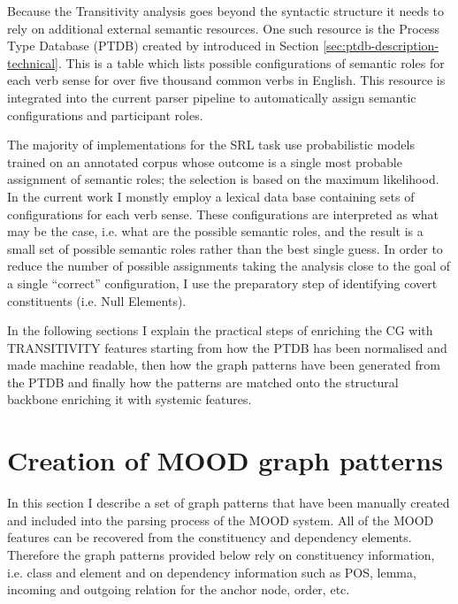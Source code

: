     Because the Transitivity analysis goes beyond the syntactic structure it needs to rely on additional external semantic resources. One such resource is the Process Type Database (PTDB) created by \citet{Neale2002} introduced in Section \ref{sec:ptdb-description-technical}. This is a table which lists possible configurations of semantic roles for each verb sense for over five thousand common verbs in English. This resource is integrated into the current parser pipeline to automatically assign semantic configurations and participant roles.


    The majority of implementations for the SRL task use probabilistic models trained on an annotated corpus whose outcome is a single most probable assignment of semantic roles; the selection is based on the maximum likelihood. In the current work I monstly employ a lexical data base containing sets of configurations for each verb sense. These configurations are interpreted as what may be the case, i.e. what are the possible semantic roles, and the result is a small set of possible semantic roles rather than the best single guess. In order to reduce the number of possible assignments taking the analysis close to the goal of a single ``correct'' configuration, I use the preparatory step of identifying covert constituents (i.e. Null Elements).

    In the following sections I explain the practical steps of enriching the CG with TRANSITIVITY features starting from how the PTDB has been normalised and made machine readable, then how the graph patterns have been generated from the PTDB and finally how the patterns are matched onto the structural backbone enriching it with systemic features.



\section{Creation of MOOD graph patterns}
\label{sec:mood-patterns}
    In this section I describe a set of graph patterns that have been manually created and included into the parsing process of the MOOD system. All of the MOOD features can be recovered from the constituency and dependency elements. Therefore the graph patterns provided below rely on constituency information, i.e. class and element and on dependency information such as POS, lemma, incoming and outgoing relation for the anchor node, order, etc. 


